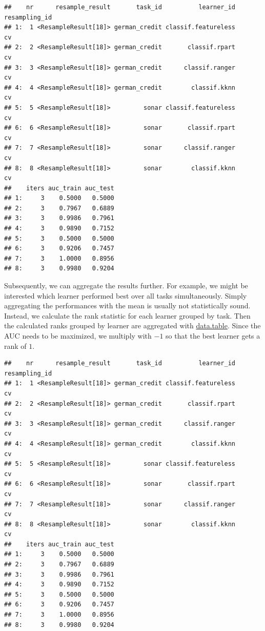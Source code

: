 \documentclass[]{scrbook}
\newenvironment{Shaded}{\begin{snugshade}}{\end{snugshade}}
\newcommand{\KeywordTok}[1]{\textcolor[rgb]{0.13,0.29,0.53}{\textbf{#1}}}
\newcommand{\NormalTok}[1]{#1}
\newcommand{\OperatorTok}[1]{\textcolor[rgb]{0.81,0.36,0.00}{\textbf{#1}}}
\newcommand{\StringTok}[1]{\textcolor[rgb]{0.31,0.60,0.02}{#1}}
\renewenvironment{Shaded} {\begin{snugshade}\small} {\end{snugshade}}
\begin{document}
\begin{verbatim}
##    nr      resample_result       task_id          learner_id resampling_id
## 1:  1 <ResampleResult[18]> german_credit classif.featureless            cv
## 2:  2 <ResampleResult[18]> german_credit       classif.rpart            cv
## 3:  3 <ResampleResult[18]> german_credit      classif.ranger            cv
## 4:  4 <ResampleResult[18]> german_credit        classif.kknn            cv
## 5:  5 <ResampleResult[18]>         sonar classif.featureless            cv
## 6:  6 <ResampleResult[18]>         sonar       classif.rpart            cv
## 7:  7 <ResampleResult[18]>         sonar      classif.ranger            cv
## 8:  8 <ResampleResult[18]>         sonar        classif.kknn            cv
##    iters auc_train auc_test
## 1:     3    0.5000   0.5000
## 2:     3    0.7967   0.6889
## 3:     3    0.9986   0.7961
## 4:     3    0.9890   0.7152
## 5:     3    0.5000   0.5000
## 6:     3    0.9206   0.7457
## 7:     3    1.0000   0.8956
## 8:     3    0.9980   0.9204
\end{verbatim}

Subsequently, we can aggregate the results further.
For example, we might be interested which learner performed best over all tasks simultaneously.
Simply aggregating the performances with the mean is usually not statistically sound.
Instead, we calculate the rank statistic for each learner grouped by task.
Then the calculated ranks grouped by learner are aggregated with \href{https://cran.r-project.org/package=data.table}{data.table}.
Since the AUC needs to be maximized, we multiply with \(-1\) so that the best learner gets a rank of \(1\).

\begin{Shaded}
\end{Shaded}

\begin{verbatim}
##    nr      resample_result       task_id          learner_id resampling_id
## 1:  1 <ResampleResult[18]> german_credit classif.featureless            cv
## 2:  2 <ResampleResult[18]> german_credit       classif.rpart            cv
## 3:  3 <ResampleResult[18]> german_credit      classif.ranger            cv
## 4:  4 <ResampleResult[18]> german_credit        classif.kknn            cv
## 5:  5 <ResampleResult[18]>         sonar classif.featureless            cv
## 6:  6 <ResampleResult[18]>         sonar       classif.rpart            cv
## 7:  7 <ResampleResult[18]>         sonar      classif.ranger            cv
## 8:  8 <ResampleResult[18]>         sonar        classif.kknn            cv
##    iters auc_train auc_test
## 1:     3    0.5000   0.5000
## 2:     3    0.7967   0.6889
## 3:     3    0.9986   0.7961
## 4:     3    0.9890   0.7152
## 5:     3    0.5000   0.5000
## 6:     3    0.9206   0.7457
## 7:     3    1.0000   0.8956
## 8:     3    0.9980   0.9204
\end{verbatim}
\end{document}
